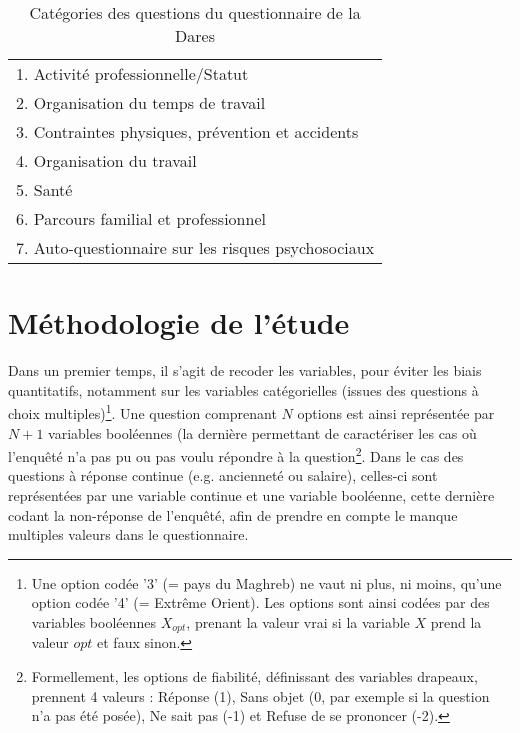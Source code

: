 \documentclass[11pt,fleqn,a4paper,openany,frenchb]{book} %
\begin{document}
\begin{table}[!h]
\centering
\begin{tabular}{|l|}
\hline
1. Activité professionnelle/Statut\\
2. Organisation du temps de travail \\
3. Contraintes physiques, prévention et accidents \\
4. Organisation du travail \\
5. Santé \\
6. Parcours familial et professionnel\\
7. Auto-questionnaire sur les risques psychosociaux\\
\hline
\end{tabular}%
\caption{Catégories des questions du questionnaire de la Dares}
\label{tab:cat_questions}
\end{table}


\section{Méthodologie de l'étude}
	Dans un premier temps, il s'agit de recoder les variables, pour éviter les biais quantitatifs, notamment sur les variables catégorielles (issues des questions à choix multiples)\footnote{Une option codée '3' (= pays du Maghreb) ne vaut ni plus, ni moins, qu'une option codée '4' (= Extrême Orient). Les options sont ainsi codées par des variables booléennes $X_{opt}$, prenant la valeur vrai
si la variable $X$ prend la valeur $opt$ et faux sinon.}. Une question comprenant $N$ options est ainsi représentée par $N+1$ variables booléennes (la dernière permettant de caractériser les cas où l'enquêté n'a pas pu ou pas voulu répondre à la question\footnote{Formellement, les options de fiabilité, définissant des variables drapeaux, prennent 4 valeurs : Réponse (1), Sans objet (0, par exemple si la question n'a pas été posée), Ne sait pas (-1) et Refuse de se prononcer (-2). }.
Dans le cas des questions à réponse continue (e.g. ancienneté ou salaire), celles-ci sont représentées par une variable continue et une variable booléenne, cette dernière codant la non-réponse de l'enquêté, afin de prendre en compte le manque multiples valeurs dans le questionnaire.\par
\end{document}
